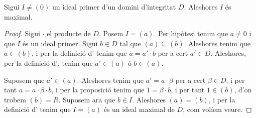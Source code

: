 \documentclass[../Apunts.tex]{subfiles}
\begin{document}
	\begin{proposition}
		\label{prop:ideal primer en DI es maximal}
		Sigui \(I\neq(0)\) un ideal primer d'un domini d'integritat \(D\). Aleshores \(I\) és maximal.
		\begin{proof}
			Sigui \(\cdot\) el producte de \(D\). Posem \(I=(a)\). Per hipòtesi tenim que \(a\neq0\) i que \(I\) és un ideal primer. Sigui \(b\in D\) tal que \((a)\subseteq(b)\). Aleshores tenim que \(a\in(b)\), i per la definició d' tenim que \(a=a'\cdot b\) per a cert \(a'\in D\). Aleshores, per la definició d', tenim que \(a'\in(a)\) ó \(b\in(a)\).
			
			Suposem que \(a'\in(a)\). Aleshores tenim que \(a'=a\cdot\beta\) per a cert \(\beta\in D\), i per tant \(a=a\cdot\beta\cdot b\), i per la proposició  tenim que \(1=\beta\cdot b\), i per tant \(1\in(b)\), d'on trobem \((b)=R\). Suposem ara que \(b\in I\). Aleshores \((a)=(b)\), i per la definició d' tenim que \(I=(a)\) és un ideal maximal de \(D\), com volíem veure.
		\end{proof}
	\end{proposition}
\end{document}

